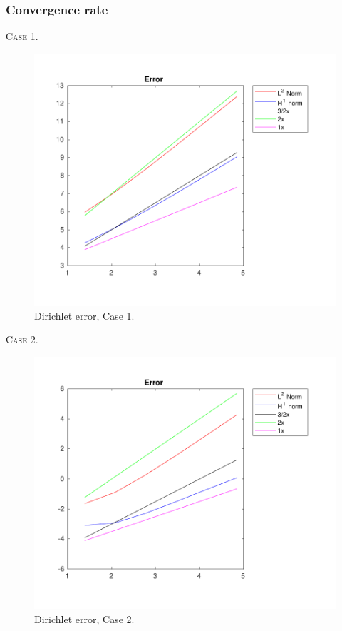 \documentclass[a4paper]{article}
\numberwithin{equation}{section}
\begin{document}
\subsubsection{Convergence rate}
\textsc{Case 1.}
\begin{figure}[H]
\centering\includegraphics[width=13.5cm]{fig_dirichlet_error_G2_CP1_I1_M6_C1}
\caption{Dirichlet error, Case 1.}
\end{figure}
\newpage
\textsc{Case 2.}
\begin{figure}[H]
\centering\includegraphics[width=13.5cm]{fig_dirichlet_error_G2_CP1_I1_M6_C2}
\caption{Dirichlet error, Case 2.}
\end{figure}
\end{document}
